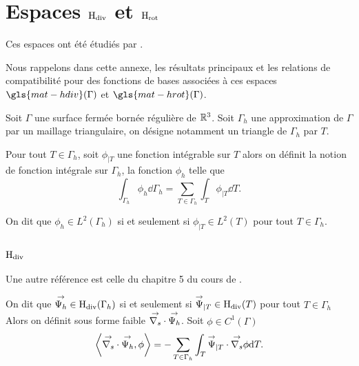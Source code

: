 \section[Espaces Hdiv et Hrot]{Espaces \(\mathrm{H}_\mathrm{div}\) et \(\mathrm{H}_\mathrm{rot}\)}
\label{sec:annexe:Hdiv_Hrot}
Ces espaces ont été étudiés par \cite{nedelec_mixed_1980}.

Nous rappelons dans cette annexe, les résultats principaux et les relations de compatibilité pour des fonctions de bases associées à ces espaces \(\gls{mat-hdiv}(\Gamma)\) et \(\gls{mat-hrot}(\Gamma)\).

Soit \(\Gamma\) une surface fermée bornée régulière de \(\mathbb R^3\).
Soit \(\Gamma_h\) une approximation de \(\Gamma\) par un maillage triangulaire, on désigne notamment un triangle de \(\Gamma_h\) par \(T\).

\begin{defn}
    Pour tout \(T \in \Gamma_h\), soit \(\phi_{|T}\) une fonction intégrable sur \(T\) alors
    on définit la notion de fonction intégrale sur \(\Gamma_h\), la fonction \(\phi_h\) telle que
    \begin{equation*}
        \int_{\Gamma_h} \phi_h \dd{\Gamma_h} = \sum_{T\in\Gamma_h} \int_T \phi_{|T} \dd{T}.
    \end{equation*}
\end{defn}

\begin{defn}
    On dit que \(\phi_h \in L^2(\Gamma_h)\) si et seulement si \(\phi_{|T} \in L^2(T)\) pour tout \(T \in \Gamma_h\).
\end{defn}

\subsection[Hdiv]{\(\mathrm{H}_\mathrm{div}\)}

Une autre référence est celle du chapitre 5 du cours de \cite{bendali_equations_2014}.

\begin{defn}
    On dit que \({\overset{\rightarrow}{\Psi_h}} \in \mathrm{H}_\mathrm{div}(\Gamma_h)\) si et seulement si \({\overset{\rightarrow}{\Psi}}_{|T} \in \mathrm{H}_\mathrm{div}(T)\) pour tout \(T \in \Gamma_h\)
    Alors on définit sous forme faible \({\overset{\rightarrow}{\nabla_s}} \cdot {\overset{\rightarrow}{\Psi_h}} \).
    Soit \(\phi \in C^1(\Gamma)\)
    \begin{equation*}
        \left< \vdivs \vect{\Psi_h}, \phi \right> %
        = - \sum_{T\in\Gamma_h} \int_T \vect{\Psi}_{|T} \cdot \vgrads \phi\dd{T}.
    \end{equation*}
\end{defn}

